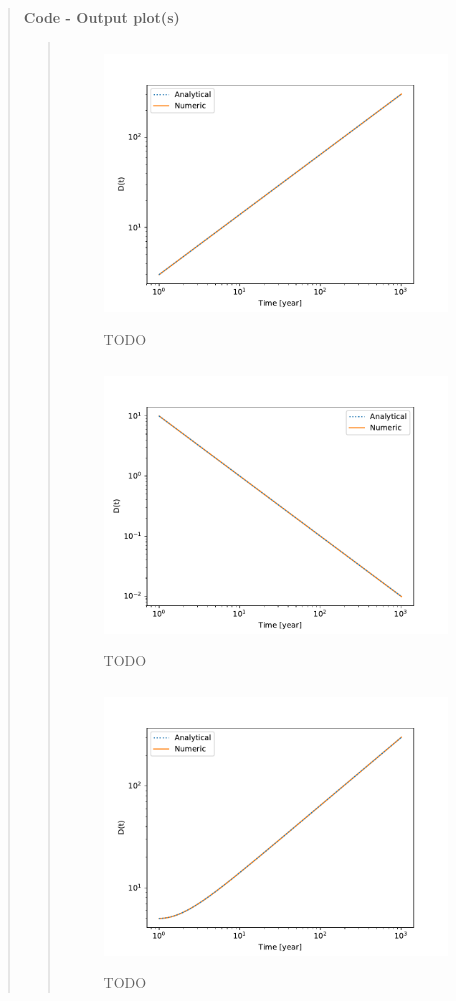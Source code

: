 \begin{quote}
\textbf{Code - Output plot(s)}
\begin{quote}
\begin{figure}[!ht]
\centering
\includegraphics[width=12cm, height=7.5cm]{./Plots/3_ode_0.pdf}
\caption{TODO}
\end{figure}

\begin{figure}[!ht]
\centering
\includegraphics[width=12cm, height=7.5cm]{./Plots/3_ode_1.pdf}
\caption{TODO}
\end{figure}

\begin{figure}[!ht]
\centering
\includegraphics[width=12cm, height=7.5cm]{./Plots/3_ode_2.pdf}
\caption{TODO}
\end{figure}

\end{quote}
\end{quote}







